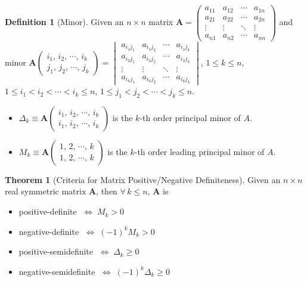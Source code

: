\documentclass[10pt]{beamer}
\newcommand{\ds}{\displaystyle}
\newcommand{\ifff}{\;\Longleftrightarrow\;}
\theoremstyle{definition}
\newtheorem*{dfn}{Definition}
\newtheorem*{thm}{Theorem}
\newcommand{\vA}{\mathbf{A}}
\begin{document}
\begin{frame}
  \begin{dfn}[Minor] 
    Given an $n\times n$ matrix $\vA = \begin{pmatrix}a_{11} & a_{12} & \cdots & a_{1n} \\ a_{21} & a_{22} & \cdots & a_{2n} \\ \vdots & \vdots & \ddots & \vdots \\ a_{n1} & a_{n2} & \cdots & a_{nn} \end{pmatrix}$ and minor $\vA\begin{pmatrix}i_1,\,i_2,\,\cdots,\,i_k\\j_1,\,j_2,\,\cdots,\,j_k\end{pmatrix} = \begin{vmatrix}a_{i_1 j_1} & a_{i_1 j_2} & \cdots & a_{i_1 j_k} \\ a_{i_2 j_1} & a_{i_2 j_2} & \cdots & a_{i_2 j_k} \\ \vdots & \vdots & \ddots & \vdots \\ a_{i_k j_1} & a_{i_k j_2} & \cdots & a_{i_k j_k} \end{vmatrix}$, $1\leqslant k\leqslant n$, $1\leqslant i_1 < i_2 < \cdots < i_k \leqslant n$, $1\leqslant j_1 < j_2 < \cdots < j_k \leqslant n$. 
    \begin{itemize}
      \item $\ds\Delta_k\equiv\vA\begin{pmatrix}i_1,\,i_2,\,\cdots,\,i_k\\i_1,\,i_2,\,\cdots,\,i_k\end{pmatrix}$ is the $k$-th order principal minor of $A$. 
      \item $\ds M_k\equiv\vA\begin{pmatrix}1,\,2,\,\cdots,\,k\\1,\,2,\,\cdots,\,k\end{pmatrix}$ is the $k$-th order leading principal minor of $A$. 
    \end{itemize}
  \end{dfn}
\end{frame}

\begin{frame}
  \begin{thm}[Criteria for Matrix Positive/Negative Definiteness] 
    Given an $n\times n$ real symmetric matrix $\vA$, then $\forall\,k\leqslant n$, $\vA$ is
    \begin{itemize}
      \item positive-definite $\ifff M_k > 0$
      \item negative-definite $\ifff (-1)^k M_k> 0$
      \item positive-semidefinite $\ifff \Delta_k \geqslant 0$
      \item negative-semidefinite $\ifff (-1)^k \Delta_k \geqslant 0$
    \end{itemize}
  \end{thm}
\end{frame}
\end{document}
